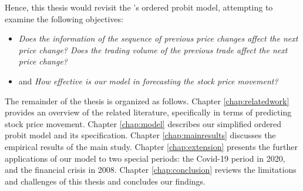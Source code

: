 Hence, this thesis would revisit the \citet{hausman1992}'s ordered probit model, attempting to examine the following objectives:
\begin{itemize}
    \item \textit{Does the information of the sequence of previous price changes affect the next price change? Does the trading volume of the previous trade affect the next price change?}
    \item and \textit{How effective is our model in forecasting the stock price movement?}
\end{itemize}

{}


The remainder of the thesis is organized as follows. Chapter \ref{chap:relatedwork} provides an overview of the related literature, specifically in terms of predicting stock price movement. Chapter \ref{chap:model} describes our simplified ordered probit model and its specification. Chapter \ref{chap:mainresults} discusses the empirical results of the main study. Chapter \ref{chap:extension} presents the further applications of our model to two special periods: the Covid-19 period in 2020, and the financial crisis in 2008. Chapter \ref{chap:conclusion} reviews the limitations and challenges of this thesis and concludes our findings.
